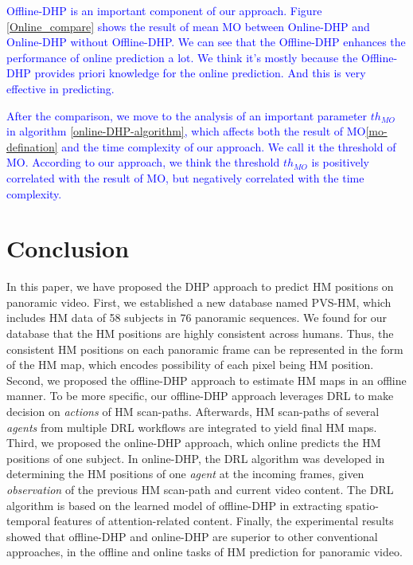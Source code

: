 \documentclass[10pt,journal,compsoc]{IEEEtran}
\begin{document}
\textcolor{blue}{Offline-DHP is an important component of our approach.
Figure \ref{Online_compare} shows the result of mean MO between Online-DHP and Online-DHP without Offline-DHP.
We can see that the Offline-DHP enhances the performance of online prediction a lot.
We think it's mostly because the Offline-DHP provides priori knowledge for the online prediction.
And this is very effective in predicting.}

\textcolor{blue}{After the comparison, we move to the analysis of an important parameter $th_{MO}$ in algorithm \ref{online-DHP-algorithm}, which affects both the result of MO\eqref{mo-defination} and the time complexity of our approach.
We call it the threshold of MO.
According to our approach, we think the threshold $th_{MO}$ is positively correlated with the result of MO, but negatively correlated with the time complexity.}



\section{Conclusion}
In this paper, we have proposed the DHP approach to predict HM positions on panoramic video. First, we established a new database named PVS-HM, which includes HM data of 58 subjects in 76 panoramic sequences. We found for our database that the HM positions are highly consistent across humans. Thus, the consistent HM positions on each panoramic frame can be represented in the form of the HM map, which encodes possibility of each pixel being HM position. Second, we proposed the offline-DHP approach to estimate HM maps in an offline manner. To be more specific, our offline-DHP approach leverages DRL to make decision on \textit {actions} of HM scan-paths. Afterwards, HM scan-paths of several \textit{agents} from multiple DRL workflows are integrated to yield final HM maps.
Third, we proposed the online-DHP approach, which online predicts the HM positions of one subject. In online-DHP, the DRL algorithm was developed in determining the HM positions of one \textit{agent} at the incoming frames, given \textit{observation} of the previous HM scan-path and current video content. The DRL algorithm is based on the learned model of offline-DHP in extracting spatio-temporal features of attention-related content. Finally, the experimental results showed that offline-DHP and online-DHP are superior to other conventional approaches, in the offline and online tasks of HM prediction for panoramic video.
\end{document}
